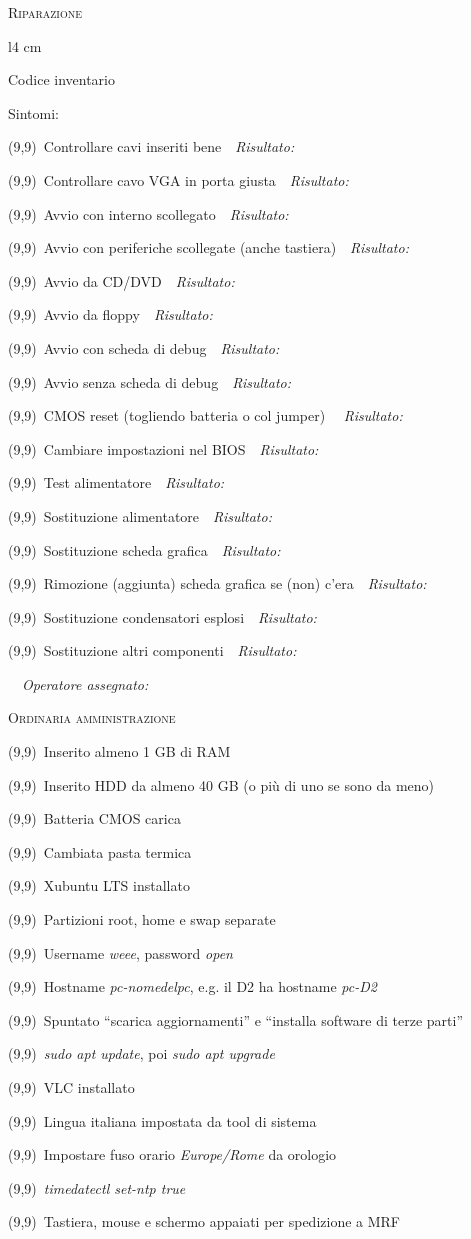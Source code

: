 \documentclass[a4paper,12pt,twoside]{article}
\newcommand{\rulespace}[1]{\ \ \textit{\small #1} \hrulefill\par}
\renewcommand{\r}{\rulespace{Risultato:}}
\renewcommand{\c}{\framebox(9,9){}\, }
\newcommand{\ci}{\hspace{1cm}\c} %
\begin{document}
\thispagestyle{empty}
{\Large\textsc{Riparazione}}\par
\begin{wrapfigure}{l}{4 cm}
	\vspace{-0.5cm}
	\begin{framed}
		\begin{centering}
		{\footnotesize Codice inventario\par}
		\vspace{2.4cm}
		\end{centering}		
	\end{framed}
	\vspace{-1.4cm}
\end{wrapfigure}
Sintomi: \hrulefill\par
\hrulefill\par
\c Controllare cavi inseriti bene\r
\c Controllare cavo VGA in porta giusta\r
\c Avvio con interno scollegato\r
\c Avvio con periferiche scollegate (anche tastiera)\r
\c Avvio da CD/DVD\r
\c Avvio da floppy\r
\c Avvio con scheda di debug\r
\c Avvio senza scheda di debug\r
\c CMOS reset (togliendo batteria o col jumper) \r
\c Cambiare impostazioni nel BIOS\r
\c Test alimentatore\r
\c Sostituzione alimentatore\r
\c Sostituzione scheda grafica\r
\c Rimozione (aggiunta) scheda grafica se (non) c'era\r
\c Sostituzione condensatori esplosi\r
\c Sostituzione altri componenti\r
\rulespace{Operatore assegnato:}
{\Large\textsc{Ordinaria amministrazione}}\par
\c Inserito almeno 1 GB di RAM\par
\c Inserito HDD da almeno 40 GB (o più di uno se sono da meno)\par
\c Batteria CMOS carica\par
\c Cambiata pasta termica\par
\c Xubuntu LTS installato\par
\ci Partizioni root, home e swap separate\par
\ci Username \textit{weee}, password \textit{open}\par
\ci Hostname \textit{pc-nomedelpc}, e.g. il D2 ha hostname \textit{pc-D2}\par
\ci Spuntato ``scarica aggiornamenti'' e ``installa software di terze parti''\par
\ci \textit{sudo apt update}, poi \textit{sudo apt upgrade}\par
\ci VLC installato\par
\ci Lingua italiana impostata da tool di sistema\par
\ci Impostare fuso orario \textit{Europe/Rome} da orologio\par
\ci \textit{timedatectl set-ntp true}\par
\c Tastiera, mouse e schermo appaiati per spedizione a MRF
\end{document}
